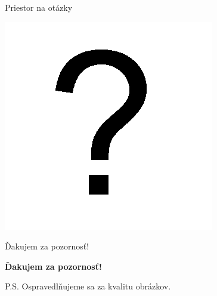 \documentclass[xcolor=dvipsnames]{beamer}
\begin{document}
\begin{frame}{Priestor na otázky}
  \begin{center}
  \includegraphics[scale=0.75]{img/question.png}
  \end{center}
\end{frame}

\begin{frame}{Ďakujem za pozornosť!}
  \begin{center}
{\bf Ďakujem za pozornosť!} 
  \end{center}
  
  \vspace{3cm}
  
  \begin{center}
  \small{P.S. Ospravedlňujeme sa za kvalitu obrázkov.}
  \end{center}
\end{frame}
\end{document}
